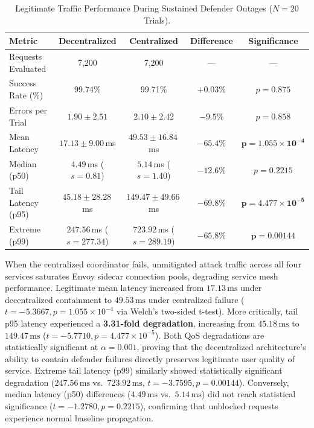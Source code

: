 \begin{table}[!t]
\renewcommand{\arraystretch}{1.2}
\caption{Legitimate Traffic Performance During Sustained Defender Outages ($N=20$ Trials).}
\label{tab:scenario3_qos_comparison}
\centering
\footnotesize
\setlength{\tabcolsep}{3.5pt}
\begin{tabular}{@{}l c c c c@{}}
\toprule
\textbf{Metric} & \textbf{Decentralized} & \textbf{Centralized} & \textbf{Difference} & \textbf{Significance} \\
\midrule
Requests Evaluated & 7,200 & 7,200 & — & — \\
Success Rate (\%)  & 99.74\% & 99.71\% & $+0.03\%$ & $p = 0.875$ \\
Errors per Trial   & $1.90 \pm 2.51$ & $2.10 \pm 2.42$ & $-9.5\%$ & $p = 0.858$ \\
Mean Latency       & $17.13 \pm 9.00$\,ms & $49.53 \pm 16.84$\,ms & \textbf{$-65.4\%$} & $\mathbf{p = 1.055 \times 10^{-4}}$ \\
Median (p50)       & $4.49$\,ms ($s=0.81$) & $5.14$\,ms ($s=1.40$) & $-12.6\%$ & $p = 0.2215$ \\
Tail Latency (p95) & $45.18 \pm 28.28$\,ms & $149.47 \pm 49.66$\,ms & \textbf{$-69.8\%$} & $\mathbf{p = 4.477 \times 10^{-5}}$ \\
Extreme (p99)      & $247.56$\,ms ($s=277.34$) & $723.92$\,ms ($s=289.19$) & \textbf{$-65.8\%$} & $\mathbf{p = 0.00144}$ \\
\bottomrule
\end{tabular}
\end{table}

When the centralized coordinator fails, unmitigated attack traffic across all four services saturates Envoy sidecar connection pools, degrading service mesh performance. Legitimate mean latency increased from $17.13\,\text{ms}$ under decentralized containment to $49.53\,\text{ms}$ under centralized failure ($t = -5.3667, p = 1.055 \times 10^{-4}$ via Welch's two-sided t-test). More critically, tail p95 latency experienced a \textbf{3.31-fold degradation}, increasing from $45.18\,\text{ms}$ to $149.47\,\text{ms}$ ($t = -5.7710, p = 4.477 \times 10^{-5}$). Both QoS degradations are statistically significant at $\alpha = 0.001$, proving that the decentralized architecture's ability to contain defender failures directly preserves legitimate user quality of service. Extreme tail latency (p99) similarly showed statistically significant degradation ($247.56\,\text{ms}$ vs.\ $723.92\,\text{ms}$, $t = -3.7595, p = 0.00144$). Conversely, median latency (p50) differences ($4.49\,\text{ms}$ vs.\ $5.14\,\text{ms}$) did not reach statistical significance ($t = -1.2780, p = 0.2215$), confirming that unblocked requests experience normal baseline propagation.

